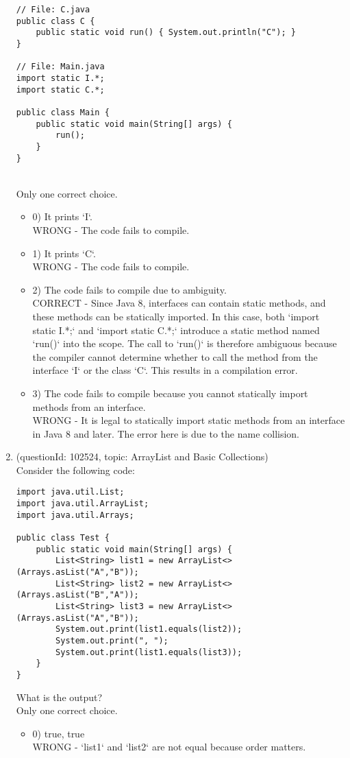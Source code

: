 \documentclass[12pt]{article}
\begin{document}
\begin{enumerate}[label=(\arabic*)]
\begin{verbatim}
// File: C.java
public class C {
    public static void run() { System.out.println("C"); }
}

// File: Main.java
import static I.*;
import static C.*;

public class Main {
    public static void main(String[] args) {
        run();
    }
}
\end{verbatim}
\\ \noindent Only one correct choice. 
\begin{itemize}
\item 0) It prints `I`.
 \\ 
WRONG - The code fails to compile.

\item 1) It prints `C`.
 \\ 
WRONG - The code fails to compile.

\item 2) The code fails to compile due to ambiguity.
 \\ 
CORRECT - Since Java 8, interfaces can contain static methods, and these methods can be statically imported. In this case, both `import static I.*;` and `import static C.*;` introduce a static method named `run()` into the scope. The call to `run()` is therefore ambiguous because the compiler cannot determine whether to call the method from the interface `I` or the class `C`. This results in a compilation error.

\item 3) The code fails to compile because you cannot statically import methods from an interface.
 \\ 
WRONG - It is legal to statically import static methods from an interface in Java 8 and later. The error here is due to the name collision.

\end{itemize}
\item (questionId: 102524, topic: ArrayList and Basic Collections) \\ 
Consider the following code:\begin{verbatim}
import java.util.List;
import java.util.ArrayList;
import java.util.Arrays;

public class Test {
    public static void main(String[] args) {
        List<String> list1 = new ArrayList<>(Arrays.asList("A","B"));
        List<String> list2 = new ArrayList<>(Arrays.asList("B","A"));
        List<String> list3 = new ArrayList<>(Arrays.asList("A","B"));
        System.out.print(list1.equals(list2));
        System.out.print(", ");
        System.out.print(list1.equals(list3));
    }
}
\end{verbatim}What is the output?
\\ \noindent Only one correct choice. 
\begin{itemize}
\item 0) true, true
 \\ 
WRONG - `list1` and `list2` are not equal because order matters.


\end{itemize}
\end{enumerate}
\end{document}
